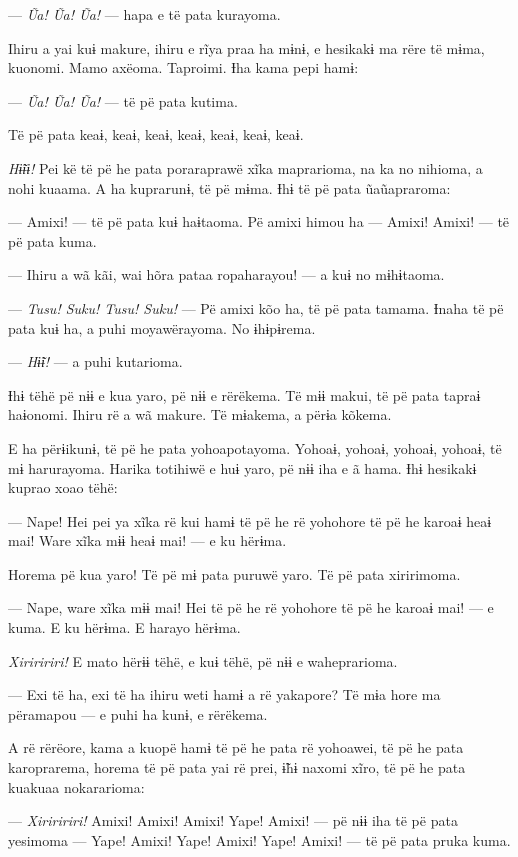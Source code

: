 --- \textit{Ũa! Ũa! Ũa!} --- hapa e të pata kurayoma. 

Ihiru a yai kuɨ makure, ihiru e rĩya praa ha mɨnɨ, e hesikakɨ ma rëre të
mɨma, kuonomi. Mamo axëoma. Taproimi. Ɨha kama pepi hamɨ: 

--- \textit{Ũa! Ũa! Ũa!} --- të pë pata kutima. 

Të pë pata keaɨ, keaɨ, keaɨ, keaɨ, keaɨ, keaɨ, keaɨ. 

\textit{Hɨ̃ɨɨ! }Pei kë të pë he pata poraraprawë xĩka maprarioma, na ka no
nihioma, a nohi kuaama. A ha kuprarunɨ, të pë mɨma. Ɨhɨ të pë pata
ũaũapraroma: 

--- Amixi! --- të pë pata kuɨ haɨtaoma. Pë amixi himou ha --- Amixi!
Amixi! --- të pë pata kuma.

--- Ihiru a wã kãi, wai hõra pataa ropaharayou! --- a kuɨ no mɨhɨtaoma.

--- \textit{Tusu! Suku! Tusu! Suku!} --- Pë amixi kõo ha, të pë pata tamama.
Ɨnaha të pë pata kuɨ ha, a puhi moyawërayoma. No ɨhɨpɨrema. 

--- \textit{Hɨ̃ɨ! }--- a puhi kutarioma. 

Ɨhɨ tëhë pë nɨɨ e kua yaro, pë nɨɨ e rërëkema. Të mɨɨ makui, të pë pata
tapraɨ haɨonomi. Ihiru rë a wã makure. Të mɨakema, a përɨa kõkema. 

E ha përɨikunɨ, të pë he pata yohoapotayoma. Yohoaɨ, yohoaɨ, yohoaɨ,
yohoaɨ, të mɨ harurayoma. Harika totihiwë e huɨ yaro, pë nɨɨ iha e ã
hama. Ɨhɨ hesikakɨ kuprao xoao tëhë:

--- Nape! Hei pei ya xĩka rë kui hamɨ të pë he rë yohohore të pë he
karoaɨ heaɨ mai! Ware xĩka mɨɨ heaɨ mai! --- e ku hërɨma. 

Horema pë kua yaro! Të pë mɨ pata puruwë yaro. Të pë pata xiririmoma. 

--- Nape, ware xĩka mɨɨ mai! Hei të pë he rë yohohore të pë he karoaɨ
mai! --- e kuma. E ku hërɨma. E harayo hërɨma. 

\textit{Xiriririri!} E mato hërɨɨ tëhë, e kuɨ tëhë, pë nɨɨ e waheprarioma. 

--- Exi të ha, exi të ha ihiru weti hamɨ a rë yakapore? Të mɨa hore ma
përamapou --- e puhi ha kunɨ, e rërëkema. 

A rë rërëore, kama a kuopë hamɨ të pë he pata rë yohoawei, të pë he pata
karoprarema, horema të pë pata yai rë prei, ɨ̃hɨ naxomi xĩro, të pë he
pata kuakuaa nokararioma:

--- \textit{Xiriririri!} Amixi! Amixi! Amixi! Yape! Amixi! --- pë nɨɨ iha të pë
pata yesimoma --- Yape! Amixi! Yape! Amixi! Yape! Amixi! --- të pë pata
pruka kuma. 

